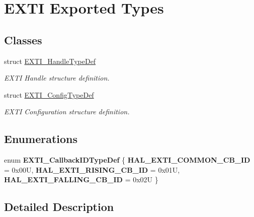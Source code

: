\hypertarget{group___e_x_t_i___exported___types}{}\section{E\+X\+TI Exported Types}
\label{group___e_x_t_i___exported___types}
\subsection*{Classes}
\begin{DoxyCompactItemize}
\item 
struct \mbox{\hyperlink{struct_e_x_t_i___handle_type_def}{E\+X\+T\+I\+\_\+\+Handle\+Type\+Def}}
\begin{DoxyCompactList}\small\item\em E\+X\+TI Handle structure definition. \end{DoxyCompactList}\item 
struct \mbox{\hyperlink{struct_e_x_t_i___config_type_def}{E\+X\+T\+I\+\_\+\+Config\+Type\+Def}}
\begin{DoxyCompactList}\small\item\em E\+X\+TI Configuration structure definition. \end{DoxyCompactList}\end{DoxyCompactItemize}
\subsection*{Enumerations}
\begin{DoxyCompactItemize}
\item 
\mbox{\label{group___e_x_t_i___exported___types_ga0ff36e8796a6ad3f2fc211e534c54c0e}} 
enum {\bfseries E\+X\+T\+I\+\_\+\+Callback\+I\+D\+Type\+Def} \{ {\bfseries H\+A\+L\+\_\+\+E\+X\+T\+I\+\_\+\+C\+O\+M\+M\+O\+N\+\_\+\+C\+B\+\_\+\+ID} = 0x00U, 
{\bfseries H\+A\+L\+\_\+\+E\+X\+T\+I\+\_\+\+R\+I\+S\+I\+N\+G\+\_\+\+C\+B\+\_\+\+ID} = 0x01U, 
{\bfseries H\+A\+L\+\_\+\+E\+X\+T\+I\+\_\+\+F\+A\+L\+L\+I\+N\+G\+\_\+\+C\+B\+\_\+\+ID} = 0x02U
 \}
\end{DoxyCompactItemize}


\subsection{Detailed Description}
